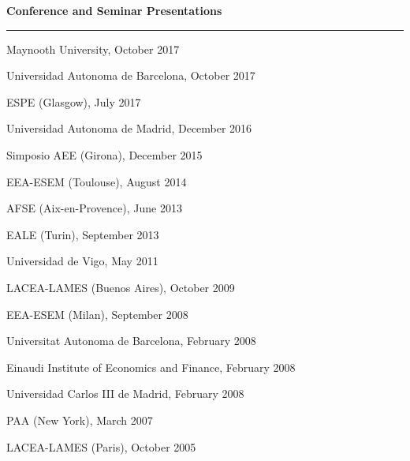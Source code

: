 \documentclass[12pt]{article}
\newcommand{\NewPart}[1]{ \vspace*{0.4cm} \noindent \large \textbf{#1}
\par \normalsize \normalfont \vspace*{-0.5cm} \noindent\rule{\textwidth}{1.8pt} \vspace*{-0.75cm} }
\newcommand{\ConferenceEntry}[2]{
		\noindent
		#1		   %
		\hspace{0em} #2 \par}     %
\begin{document}
\NewPart{Conference and Seminar Presentations}{}

\ConferenceEntry{Maynooth University, October 2017}

\ConferenceEntry{Universidad Autonoma de Barcelona, October 2017}

\ConferenceEntry{ESPE (Glasgow), July 2017}

\ConferenceEntry{Universidad Autonoma de Madrid, December 2016}

\ConferenceEntry{Simposio AEE (Girona), December 2015}

\ConferenceEntry{EEA-ESEM (Toulouse), August 2014}

\ConferenceEntry{AFSE (Aix-en-Provence), June 2013}

\ConferenceEntry{EALE (Turin), September 2013}

\ConferenceEntry{Universidad de Vigo, May 2011}

\ConferenceEntry{LACEA-LAMES (Buenos Aires), October 2009}

\ConferenceEntry{EEA-ESEM (Milan), September 2008}

\ConferenceEntry{Universitat Autonoma de Barcelona, February 2008}

\ConferenceEntry{Einaudi Institute of Economics and Finance, February 2008} 

\ConferenceEntry{Universidad Carlos III de Madrid, February 2008} 

\ConferenceEntry{PAA (New York), March 2007}

\ConferenceEntry{LACEA-LAMES (Paris), October 2005}


%
%
%
%
%
\end{document}
